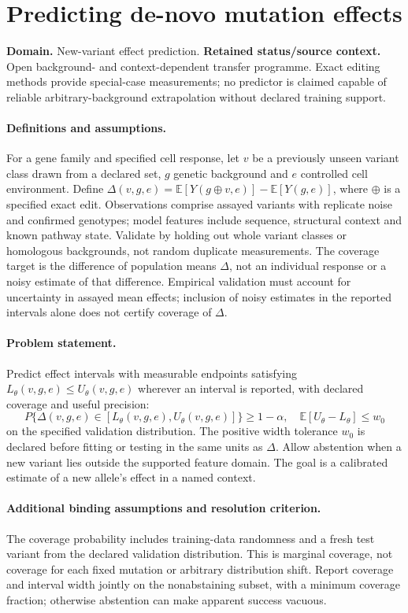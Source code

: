\documentclass[11pt]{article}
\begin{document}
\section*{Predicting de-novo mutation effects}
\label{prob:029}
\label{rank:56}
\par\smallskip

\noindent\textbf{Domain.} New-variant effect prediction. \quad \textbf{Retained status/source context.} Open background- and context-dependent transfer programme. Exact editing methods provide special-case measurements; no predictor is claimed capable of reliable arbitrary-background extrapolation without declared training support.
\paragraph{Definitions and assumptions.} For a gene family and specified cell response, let $v$ be a previously unseen variant class drawn from a declared set, $g$ genetic background and $e$ controlled cell environment. Define $\Delta(v,g,e)=\mathbb{E}[Y(g\oplus v,e)]-\mathbb{E}[Y(g,e)]$, where $\oplus$ is a specified exact edit. Observations comprise assayed variants with replicate noise and confirmed genotypes; model features include sequence, structural context and known pathway state. Validate by holding out whole variant classes or homologous backgrounds, not random duplicate measurements. The coverage target is the difference of population means $\Delta$, not an individual response or a noisy estimate of that difference. Empirical validation must account for uncertainty in assayed mean effects; inclusion of noisy estimates in the reported intervals alone does not certify coverage of $\Delta$.
\paragraph{Problem statement.} Predict effect intervals with measurable endpoints satisfying $L_\theta(v,g,e)\leq U_\theta(v,g,e)$ wherever an interval is reported, with declared coverage and useful precision:
\[
P\{\Delta(v,g,e)\in[L_\theta(v,g,e),U_\theta(v,g,e)]\}\geq1-\alpha,
\quad \mathbb{E}[U_\theta-L_\theta]\leq w_0
\]
on the specified validation distribution. The positive width tolerance $w_0$ is declared before fitting or testing in the same units as $\Delta$. Allow abstention when a new variant lies outside the supported feature domain. The goal is a calibrated estimate of a new allele's effect in a named context.
\paragraph{Additional binding assumptions and resolution criterion.} The coverage probability includes training-data randomness and a fresh test variant from the declared validation distribution. This is marginal coverage, not coverage for each fixed mutation or arbitrary distribution shift. Report coverage and interval width jointly on the nonabstaining subset, with a minimum coverage fraction; otherwise abstention can make apparent success vacuous.
\end{document}
